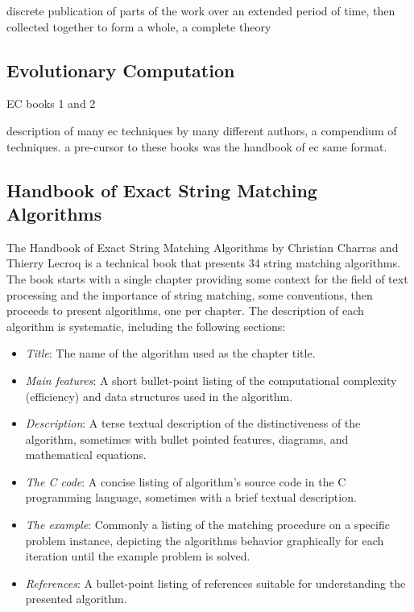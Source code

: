 \documentclass[a4paper, 11pt]{article}
\begin{document}
discrete publication of parts of the work over an extended period of time, then collected together to form a whole, a complete theory

% 
% 
\subsection{Evolutionary Computation}

EC books 1 \cite{Baeck2000} and 2 \cite{Baeck2000a}

description of many ec techniques by many different authors, a compendium of techniques. a pre-cursor to these books was the handbook of ec \cite{Baeck1997} same format. 



% 
% 
\subsection{Handbook of Exact String Matching Algorithms}
\label{subsec:strings}
The Handbook of Exact String Matching Algorithms by Christian Charras and Thierry Lecroq \cite{Charras2004} is a technical book that presents 34 string matching algorithms. The book starts with a single chapter providing some context for the field of text processing and the importance of string matching, some conventions, then proceeds to present algorithms, one per chapter. The description of each algorithm is systematic, including the following sections:

\begin{itemize}
	\item \emph{Title}: The name of the algorithm used as the chapter title.
	\item \emph{Main features}: A short bullet-point listing of the computational complexity (efficiency) and data structures used in the algorithm.
	\item \emph{Description}: A terse textual description of the distinctiveness of the algorithm, sometimes with bullet pointed features, diagrams, and mathematical equations. 
	\item \emph{The C code}: A concise listing of algorithm's source code in the C programming language, sometimes with a brief textual description.
	\item \emph{The example}: Commonly a listing of the matching procedure on a specific problem instance, depicting the algorithms behavior graphically for each iteration until the example problem is solved.
	\item \emph{References}: A bullet-point listing of references suitable for understanding the presented algorithm.
\end{itemize}
\end{document}

